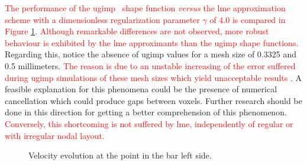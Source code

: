 \documentclass[preprint,12pt,a4paper]{elsarticle}
\newcommand{\PNA}[1]{
  \textcolor{red}{{#1}}
}
\begin{document}
\PNA{The performance of the
\acrshort{ugimp}~\cite{Bardenhagen2004} shape function \textit{versus} the \acrshort{lme} approximation scheme with
a dimensionless regularization parameter $\gamma$ of 4.0 is compared in Figure \ref{fig:Dyka-uGIMP-LME}. Although remarkable differences are not observed, more
robust behaviour is exhibited by the \acrshort{lme} approximants than the \acrshort{ugimp} shape functions.} Regarding this, notice
the absence of \acrshort{ugimp} values for a mesh size of 0.3325 and 0.5
millimeters. \PNA{The reason is due to an unstable
increasing of the error suffered during \acrshort{ugimp} simulations of these mesh sizes which yield unacceptable results}. A feasible
explanation for this phenomena could be the presence of numerical
cancellation which could produce gaps between voxels. Further research
should be done in this direction for getting a better comprehension of
this phenomenon. \PNA{Conversely, this shortcoming is not suffered by \acrshort{lme}, independently of regular or with irregular nodal layout.}
\begin{figure}\sidecaption
  \centering
  \caption{Velocity evolution at the point in the bar left side.}
  \label{fig:Dyka-uGIMP-LME}
\end{figure}
\end{document}
